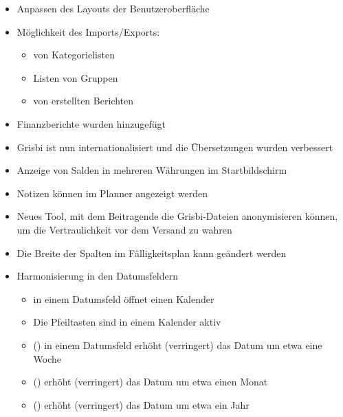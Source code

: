 \begin{itemize}
	\item Anpassen des Layouts der Benutzeroberfläche%
	\item Möglichkeit des Imports/Exports:%
		\begin{itemize}
		\item[\textopenbullet] von Kategorielisten%
		\item[\textopenbullet] Listen von Gruppen%
		\item[\textopenbullet] von erstellten Berichten%
		\end{itemize}	
	\item Finanzberichte wurden hinzugefügt%
	\item Grisbi ist nun internationalisiert und die Übersetzungen wurden verbessert%
	\item Anzeige von Salden in mehreren Währungen im Startbildschirm%
	\item Notizen können im Planner angezeigt werden%
	\item Neues Tool, mit dem Beitragende die Grisbi-Dateien anonymisieren können, um die Vertraulichkeit vor dem Versand zu wahren%
	\item Die Breite der Spalten im Fälligkeitsplan kann geändert werden%
	\item Harmonisierung in den Datumsfeldern%
		\begin{itemize}
		\item[\textopenbullet]  in einem Datumsfeld öffnet einen Kalender%
		\item[\textopenbullet] Die Pfeiltasten sind in einem Kalender aktiv%
		\item[\textopenbullet] \key{+} (\key{-}) in einem Datumsfeld erhöht (verringert) das Datum um etwa eine Woche%
		\item[\textopenbullet]  () erhöht (verringert) das Datum um etwa einen Monat%
		\item[\textopenbullet]  () erhöht (verringert) das Datum um etwa ein Jahr%
		\end{itemize}	
\end{itemize}

